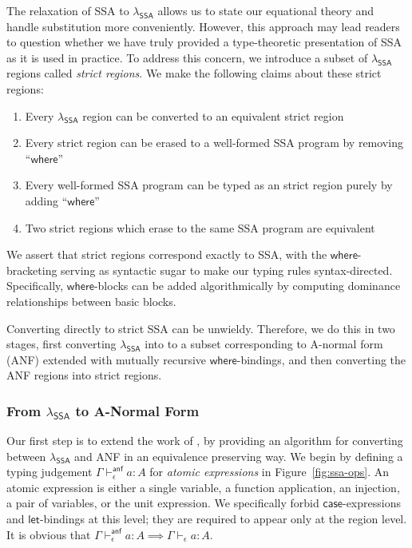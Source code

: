 \documentclass[acmsmall,screen,review]{acmart}
\newcommand{\ms}[1]{\ensuremath{\mathsf{#1}}}
\newcommand{\hasty}[4]{#1 \vdash_{#2} #3: {#4}}
\newcommand{\ahasty}[4]{#1 \vdash_{#2}^{\ms{anf}} #3 : {#4}}
\newcommand{\isotopessa}{\(\lambda_{\ms{SSA}}\)}
\begin{document}
The relaxation of SSA to \isotopessa{} allows us to state our equational theory and handle
substitution more conveniently. However, this approach may lead readers to question whether we have
truly provided a type-theoretic presentation of SSA as it is used in practice. To address this
concern, we introduce a subset of \isotopessa{} regions called \emph{strict regions}. We make the
following claims about these strict regions:
\begin{enumerate}
  \item Every \isotopessa{} region can be converted to an equivalent strict region 
  \label{claim:ssa-conv}
  \item Every strict region can be erased to a well-formed SSA program by removing
  ``\ms{where}'' \label{claim:ssa-erase}
  \item Every well-formed SSA program can be typed as an strict region purely by adding
  ``\ms{where}'' \label{claim:ssa-wf}
  \item Two strict regions which erase to the same SSA program are equivalent
  \label{claim:ssa-inj}
\end{enumerate}
We assert that strict regions correspond exactly to SSA, with the \ms{where}-bracketing serving as
syntactic sugar to make our typing rules syntax-directed. Specifically, \ms{where}-blocks can be
added algorithmically by computing dominance relationships between basic blocks.

Converting directly to strict SSA can be unwieldy. Therefore, we do
this in two stages, first converting \isotopessa{} into to a subset
corresponding to A-normal form (ANF) extended with mutually recursive
\ms{where}-bindings, and then converting the ANF regions into strict
regions.

\subsubsection{From \isotopessa{} to A-Normal Form}

Our first step is to extend the work of \citet{chakravarty-functional-ssa-2003}, by providing an
algorithm for converting between \isotopessa{} and ANF in an equivalence preserving way. We begin by
defining a typing judgement $\ahasty{\Gamma}{\epsilon}{a}{A}$ for \emph{atomic expressions} in
Figure~\ref{fig:ssa-ops}. An atomic expression is either a single variable, a function application,
an injection, a pair of variables, or the unit expression. We specifically forbid
\ms{case}-expressions and \ms{let}-bindings at this level; they are required to appear only at the
region level. It is obvious that $\ahasty{\Gamma}{\epsilon}{a}{A} \implies
\hasty{\Gamma}{\epsilon}{a}{A}$. 
\end{document}
